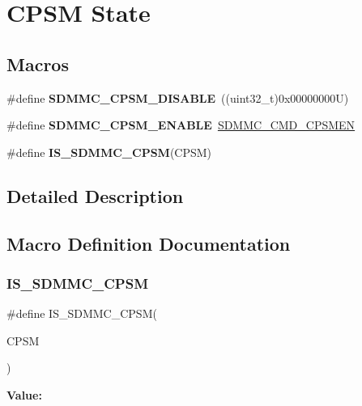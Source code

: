 \hypertarget{group___s_d_m_m_c___l_l___c_p_s_m___state}{}\section{C\+P\+SM State}
\label{group___s_d_m_m_c___l_l___c_p_s_m___state}
\subsection*{Macros}
\begin{DoxyCompactItemize}
\item 
\mbox{\label{group___s_d_m_m_c___l_l___c_p_s_m___state_ga7e1d9497bdd83ff9e9eb32ec69725694}} 
\#define {\bfseries S\+D\+M\+M\+C\+\_\+\+C\+P\+S\+M\+\_\+\+D\+I\+S\+A\+B\+LE}~((uint32\+\_\+t)0x00000000\+U)
\item 
\mbox{\label{group___s_d_m_m_c___l_l___c_p_s_m___state_gaaec0ca6c6910f7a65fce7f81fb81d6ad}} 
\#define {\bfseries S\+D\+M\+M\+C\+\_\+\+C\+P\+S\+M\+\_\+\+E\+N\+A\+B\+LE}~\mbox{\hyperlink{group___peripheral___registers___bits___definition_gaf0a08be5009835b5537cc75db92378bc}{S\+D\+M\+M\+C\+\_\+\+C\+M\+D\+\_\+\+C\+P\+S\+M\+EN}}
\item 
\#define {\bfseries I\+S\+\_\+\+S\+D\+M\+M\+C\+\_\+\+C\+P\+SM}(C\+P\+SM)
\end{DoxyCompactItemize}


\subsection{Detailed Description}


\subsection{Macro Definition Documentation}
\mbox{\label{group___s_d_m_m_c___l_l___c_p_s_m___state_ga46b1a81e9c96bddce53d3ea5449bcf76}} 
\subsubsection{\texorpdfstring{IS\_SDMMC\_CPSM}{IS\_SDMMC\_CPSM}}
{\footnotesize\ttfamily \#define I\+S\+\_\+\+S\+D\+M\+M\+C\+\_\+\+C\+P\+SM(\begin{DoxyParamCaption}\item[{}]{C\+P\+SM }\end{DoxyParamCaption})}

{\bfseries Value\+:}
\begin{DoxyCode}{0}

\end{DoxyCode}
